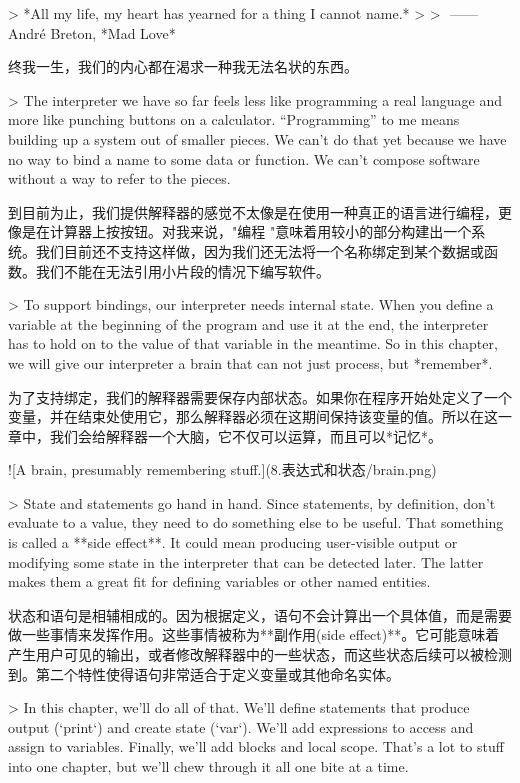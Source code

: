 \documentclass[cn,11pt,chinese]{elegantbook}
\begin{document}
{{{> *All my life, my heart has yearned for a thing I cannot name.*
>
> ​																																		——    André Breton, *Mad Love*

终我一生，我们的内心都在渴求一种我无法名状的东西。

> The interpreter we have so far feels less like programming a real language and more like punching buttons on a calculator. “Programming” to me means building up a system out of smaller pieces. We can’t do that yet because we have no way to bind a name to some data or function. We can’t compose software without a way to refer to the pieces.

到目前为止，我们提供解释器的感觉不太像是在使用一种真正的语言进行编程，更像是在计算器上按按钮。对我来说，"编程 "意味着用较小的部分构建出一个系统。我们目前还不支持这样做，因为我们还无法将一个名称绑定到某个数据或函数。我们不能在无法引用小片段的情况下编写软件。

> To support bindings, our interpreter needs internal state. When you define a variable at the beginning of the program and use it at the end, the interpreter has to hold on to the value of that variable in the meantime. So in this chapter, we will give our interpreter a brain that can not just process, but *remember*.

为了支持绑定，我们的解释器需要保存内部状态。如果你在程序开始处定义了一个变量，并在结束处使用它，那么解释器必须在这期间保持该变量的值。所以在这一章中，我们会给解释器一个大脑，它不仅可以运算，而且可以*记忆*。

![A brain, presumably remembering stuff.](8.表达式和状态/brain.png)

> State and statements go hand in hand. Since statements, by definition, don’t evaluate to a value, they need to do something else to be useful. That something is called a **side effect**. It could mean producing user-visible output or modifying some state in the interpreter that can be detected later. The latter makes them a great fit for defining variables or other named entities.

状态和语句是相辅相成的。因为根据定义，语句不会计算出一个具体值，而是需要做一些事情来发挥作用。这些事情被称为**副作用(side effect)**。它可能意味着产生用户可见的输出，或者修改解释器中的一些状态，而这些状态后续可以被检测到。第二个特性使得语句非常适合于定义变量或其他命名实体。

> In this chapter, we’ll do all of that. We’ll define statements that produce output (`print`) and create state (`var`). We’ll add expressions to access and assign to variables. Finally, we’ll add blocks and local scope. That’s a lot to stuff into one chapter, but we’ll chew through it all one bite at a time.

}}}
\end{document}
